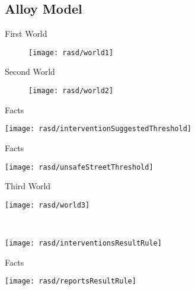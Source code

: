 	\subsection{Alloy Model}
		\begin{frame}{First World}

			\begin{figure}[hbtp]
				\centering
				\hspace*{-0.9cm}
				\vspace*{2.5cm}
				\texttt{[image: rasd/world1]}
			\end{figure}
		\end{frame}
	
		\begin{frame}{Second World}
			\vspace*{-1.5cm}
			\begin{figure}
				\centering
				\texttt{[image: rasd/world2]}
			\end{figure}
		\end{frame}
	
		\begin{frame}{Facts}
			\begin{minipage}{0.4\textwidth}
				\centering
				\texttt{[image: rasd/interventionSuggestedThreshold]}
			\end{minipage}\hspace{0.5cm}
		\end{frame}

		\begin{frame}{Facts}
			\begin{minipage}{0.4\textwidth}
				\centering
				\texttt{[image: rasd/unsafeStreetThreshold]}
			\end{minipage}\hspace{0.5cm}
		\end{frame}
	
		\begin{frame}{Third World}
			\begin{minipage}{0.4\textwidth}
				\centering
				\texttt{[image: rasd/world3]}
			\end{minipage}\hspace{0.5cm}
			~
			\begin{minipage}{0.4\textwidth}
				\centering
				\texttt{[image: rasd/interventionsResultRule]}
			\end{minipage}
		\end{frame}
	
		\begin{frame}{Facts}
			\begin{minipage}{0.4\textwidth}
				\centering
				\texttt{[image: rasd/reportsResultRule]}
			\end{minipage}\hspace{0.5cm}
		\end{frame}